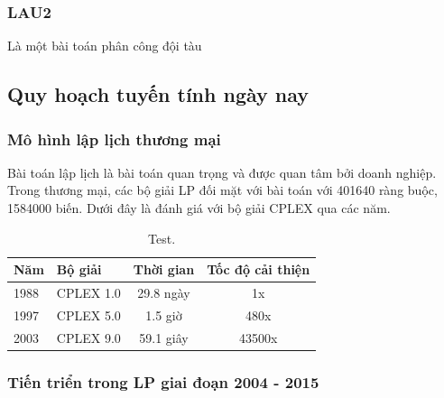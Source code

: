 \subsubsection{LAU2} Là một bài toán phân công đội tàu

\subsection{Quy hoạch tuyến tính ngày nay}

\subsubsection{Mô hình lập lịch thương mại}

Bài toán lập lịch là bài toán quan trọng và được quan tâm bởi doanh nghiệp. Trong thương mại, các bộ giải LP đối mặt với bài toán với 401640 ràng buộc, 1584000 biến. Dưới đây là đánh giá với bộ giải CPLEX qua các năm.

\begin{table}[h!]
    \caption{Test.}
    \centering
    \begin{tabular}{llcc}
        \hline
        Năm &  Bộ giải &  Thời gian & Tốc độ cải thiện  \\
        \hline
        1988 & CPLEX 1.0 & 29.8 ngày & 1x \\
        1997 & CPLEX 5.0 & 1.5 giờ & 480x \\ 
        2003 & CPLEX 9.0 & 59.1 giây & 43500x \\ 
        \hline
    \end{tabular}
\end{table}

\subsubsection{Tiến triển trong LP giai đoạn 2004 - 2015}